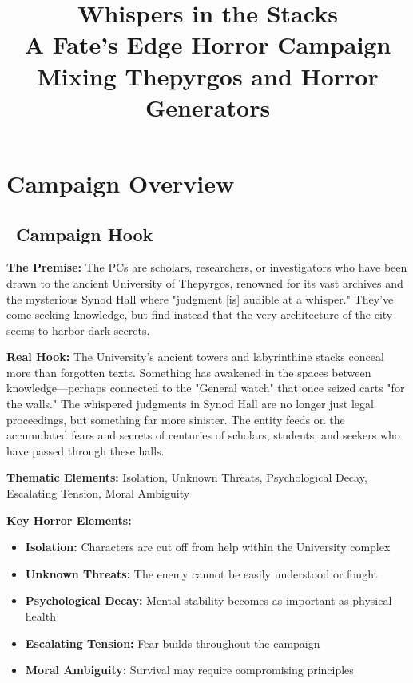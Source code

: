 \documentclass[11pt]{article}
\title{\Huge\textbf{Whispers in the Stacks}\\
\Large A Fate's Edge Horror Campaign\\
\large Mixing Thepyrgos and Horror Generators}
\author{}
\date{}
\begin{document}
\maketitle

\begin{center}
\end{center}

\section{Campaign Overview}

\subsection*{\faMap\ Campaign Hook}

\textbf{The Premise:} The PCs are scholars, researchers, or investigators who have been drawn to the ancient University of Thepyrgos, renowned for its vast archives and the mysterious Synod Hall where "judgment [is] audible at a whisper." They've come seeking knowledge, but find instead that the very architecture of the city seems to harbor dark secrets.

\textbf{Real Hook:} The University's ancient towers and labyrinthine stacks conceal more than forgotten texts. Something has awakened in the spaces between knowledge—perhaps connected to the "General watch" that once seized carts "for the walls." The whispered judgments in Synod Hall are no longer just legal proceedings, but something far more sinister. The entity feeds on the accumulated fears and secrets of centuries of scholars, students, and seekers who have passed through these halls.

\textbf{Thematic Elements:} Isolation, Unknown Threats, Psychological Decay, Escalating Tension, Moral Ambiguity

\textbf{Key Horror Elements:}
\begin{itemize}
    \item \textbf{Isolation:} Characters are cut off from help within the University complex
    \item \textbf{Unknown Threats:} The enemy cannot be easily understood or fought
    \item \textbf{Psychological Decay:} Mental stability becomes as important as physical health
    \item \textbf{Escalating Tension:} Fear builds throughout the campaign
    \item \textbf{Moral Ambiguity:} Survival may require compromising principles
\end{itemize}
\end{document}
